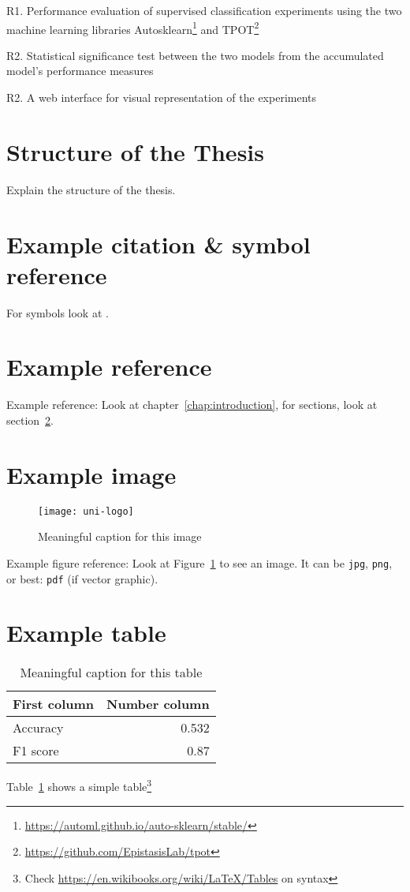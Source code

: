 R1.\label{point:R1} Performance evaluation of supervised classification experiments using the two machine learning libraries Autosklearn\footnote{\url{https://automl.github.io/auto-sklearn/stable/}} and TPOT\footnote{\url{https://github.com/EpistasisLab/tpot}}

R2.\label{point:R2} Statistical significance test between the two models from the accumulated model's performance measures

R2.\label{point:R3} A web interface for visual representation of the experiments



\section{Structure of the Thesis}

Explain the structure of the thesis. 


\section{Example citation \& symbol reference}\label{sec:citation}
For symbols look at \cite{latex_symbols_2017}.


\section{Example reference}
Example reference: Look at chapter~\ref{chap:introduction}, for sections, look at section~\ref{sec:citation}.

\section{Example image}

\begin{figure}
	\centering
	\texttt{[image: uni-logo]}
	\caption{Meaningful caption for this image}
	\label{fig:uniLogo}
\end{figure}

Example figure reference: Look at Figure~\ref{fig:uniLogo} to see an image. It can be \texttt{jpg}, \texttt{png}, or best: \texttt{pdf} (if vector graphic).

\section{Example table}

\begin{table}
	\centering
	\begin{tabular}{lr}
		First column & Number column \\
		\hline
		Accuracy & 0.532 \\
		F1 score & 0.87
	\end{tabular}
	\caption{Meaningful caption for this table}
	\label{tab:result}
\end{table}

Table~\ref{tab:result} shows a simple table\footnote{Check \url{https://en.wikibooks.org/wiki/LaTeX/Tables} on syntax}